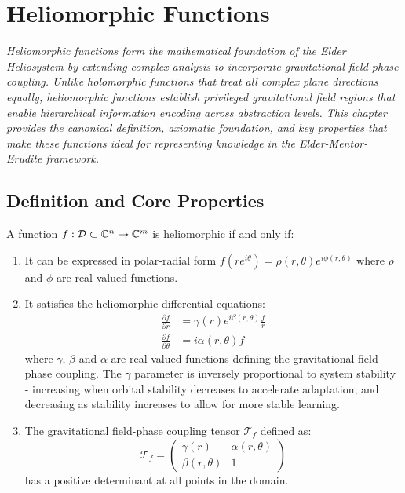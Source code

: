 \chapter{Heliomorphic Functions}

\textit{Heliomorphic functions form the mathematical foundation of the Elder Heliosystem by extending complex analysis to incorporate gravitational field-phase coupling. Unlike holomorphic functions that treat all complex plane directions equally, heliomorphic functions establish privileged gravitational field regions that enable hierarchical information encoding across abstraction levels. This chapter provides the canonical definition, axiomatic foundation, and key properties that make these functions ideal for representing knowledge in the Elder-Mentor-Erudite framework.}

\section{Definition and Core Properties}

\begin{definition}
A function $f: \mathcal{D} \subset \mathbb{C}^n \rightarrow \mathbb{C}^m$ is heliomorphic if and only if:
\begin{enumerate}
    \item It can be expressed in polar-radial form $f(re^{i\theta}) = \rho(r,\theta)e^{i\phi(r,\theta)}$ where $\rho$ and $\phi$ are real-valued functions.
    
    \item It satisfies the heliomorphic differential equations:
    \begin{align}
        \frac{\partial f}{\partial r} &= \gamma(r)e^{i\beta(r,\theta)}\frac{f}{r}\\
        \frac{\partial f}{\partial \theta} &= i\alpha(r,\theta)f
    \end{align}
    where $\gamma$, $\beta$ and $\alpha$ are real-valued functions defining the gravitational field-phase coupling. The $\gamma$ parameter is inversely proportional to system stability - increasing when orbital stability decreases to accelerate adaptation, and decreasing as stability increases to allow for more stable learning.
    
    \item The gravitational field-phase coupling tensor $\mathcal{T}_f$ defined as:
    \begin{equation}
        \mathcal{T}_f = \begin{pmatrix}
            \gamma(r) & \alpha(r,\theta)\\
            \beta(r,\theta) & 1
        \end{pmatrix}
    \end{equation}
    has a positive determinant at all points in the domain.
\end{enumerate}
\end{definition}

